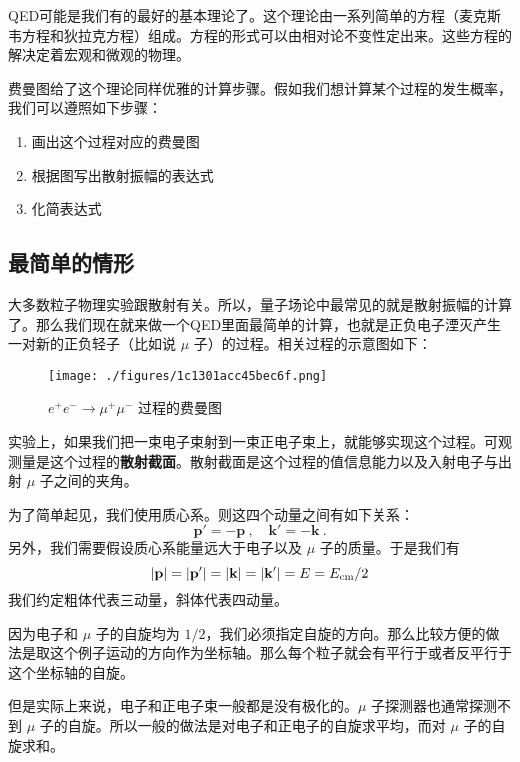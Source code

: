 

QED可能是我们有的最好的基本理论了。这个理论由一系列简单的方程（麦克斯韦方程和狄拉克方程）组成。方程的形式可以由相对论不变性定出来。这些方程的解决定着宏观和微观的物理。

费曼图给了这个理论同样优雅的计算步骤。假如我们想计算某个过程的发生概率，我们可以遵照如下步骤：

\begin{enumerate}
\item 画出这个过程对应的费曼图
\item 根据图写出散射振幅的表达式
\item 化简表达式
\end{enumerate}

\subsection{最简单的情形}
大多数粒子物理实验跟散射有关。所以，量子场论中最常见的就是散射振幅的计算了。那么我们现在就来做一个QED里面最简单的计算，也就是正负电子湮灭产生一对新的正负轻子（比如说 $\mu$ 子）的过程。相关过程的示意图如下：

\begin{figure}[ht]
\centering
\texttt{[image: ./figures/1c1301acc45bec6f.png]}
\caption{$e^+e^-\rightarrow\mu^+\mu^-$ 过程的费曼图} \label{fig_QFT0_1}
\end{figure}

实验上，如果我们把一束电子束射到一束正电子束上，就能够实现这个过程。可观测量是这个过程的\textbf{散射截面}。散射截面是这个过程的值信息能力以及入射电子与出射 $\mu$ 子之间的夹角。

为了简单起见，我们使用质心系。则这四个动量之间有如下关系：
\begin{equation}
\mathbf p' = - \mathbf p~, \quad \mathbf k'=-\mathbf k~.
\end{equation}
另外，我们需要假设质心系能量远大于电子以及 $\mu$ 子的质量。于是我们有
\begin{equation}
|\mathbf p| = |\mathbf p'| = |\mathbf k| = |\mathbf k'| = E = E_{\rm cm}/2
\end{equation}
我们约定粗体代表三动量，斜体代表四动量。

因为电子和 $\mu$ 子的自旋均为 $1/2$，我们必须指定自旋的方向。那么比较方便的做法是取这个例子运动的方向作为坐标轴。那么每个粒子就会有平行于或者反平行于这个坐标轴的自旋。

但是实际上来说，电子和正电子束一般都是没有极化的。$\mu$ 子探测器也通常探测不到 $\mu$ 子的自旋。所以一般的做法是对电子和正电子的自旋求平均，而对 $\mu$ 子的自旋求和。

